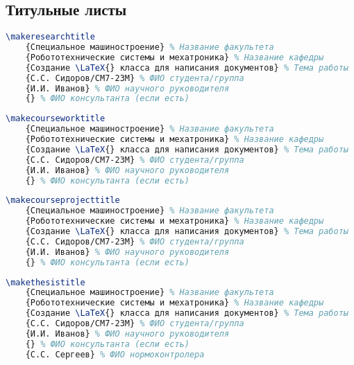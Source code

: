 \begin{appendices}

\chapter{Титульные листы}

\label{appendix:titlepage}

\begin{lstlisting}[language=TeX,
        caption=Код для создания титульного листа НИР,
        label=code:titlepage_makeresearchtitle]
\makeresearchtitle
    {Специальное машиностроение} % Название факультета
    {Робототехнические системы и мехатроника} % Название кафедры
    {Создание \LaTeX{} класса для написания документов} % Тема работы
    {С.С. Сидоров/СМ7-23М} % ФИО студента/группа
    {И.И. Иванов} % ФИО научного руководителя
    {} % ФИО консультанта (если есть)
\end{lstlisting}

\begin{lstlisting}[language=TeX,
    caption=Код для создания титульного листа КР,
    label=code:titlepage_makecourseworktitle]
\makecourseworktitle
    {Специальное машиностроение} % Название факультета
    {Робототехнические системы и мехатроника} % Название кафедры
    {Создание \LaTeX{} класса для написания документов} % Тема работы
    {С.С. Сидоров/СМ7-23М} % ФИО студента/группа
    {И.И. Иванов} % ФИО научного руководителя
    {} % ФИО консультанта (если есть)

\end{lstlisting}

\begin{lstlisting}[language=TeX,
    caption=Код для создания титульного листа КП,
    label=code:titlepage_makecourseprojecttitle]
\makecourseprojecttitle
    {Специальное машиностроение} % Название факультета
    {Робототехнические системы и мехатроника} % Название кафедры
    {Создание \LaTeX{} класса для написания документов} % Тема работы
    {С.С. Сидоров/СМ7-23М} % ФИО студента/группа
    {И.И. Иванов} % ФИО научного руководителя
    {} % ФИО консультанта (если есть)
\end{lstlisting}

\newpage

\begin{lstlisting}[language=TeX,
    caption=Код для создания титульного листа ВКР,
    label=code:titlepage_makethesistitle]
\makethesistitle
    {Специальное машиностроение} % Название факультета
    {Робототехнические системы и мехатроника} % Название кафедры
    {Создание \LaTeX{} класса для написания документов} % Тема работы
    {С.С. Сидоров/СМ7-23М} % ФИО студента/группа
    {И.И. Иванов} % ФИО научного руководителя
    {} % ФИО консультанта (если есть)
    {С.С. Сергеев} % ФИО нормоконтролера
\end{lstlisting}


\end{appendices}
